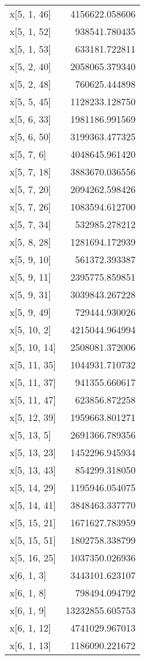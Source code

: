\begin{longtable}{lr}
x[5, 1, 46] & 4156622.058606 \\
x[5, 1, 52] & 938541.780435 \\
x[5, 1, 53] & 633181.722811 \\
x[5, 2, 40] & 2058065.379340 \\
x[5, 2, 48] & 760625.444898 \\
x[5, 5, 45] & 1128233.128750 \\
x[5, 6, 33] & 1981186.991569 \\
x[5, 6, 50] & 3199363.477325 \\
x[5, 7, 6] & 4048645.961420 \\
x[5, 7, 18] & 3883670.036556 \\
x[5, 7, 20] & 2094262.598426 \\
x[5, 7, 26] & 1083594.612700 \\
x[5, 7, 34] & 532985.278212 \\
x[5, 8, 28] & 1281694.172939 \\
x[5, 9, 10] & 561372.393387 \\
x[5, 9, 11] & 2395775.859851 \\
x[5, 9, 31] & 3039843.267228 \\
x[5, 9, 49] & 729444.930026 \\
x[5, 10, 2] & 4215044.964994 \\
x[5, 10, 14] & 2508081.372006 \\
x[5, 11, 35] & 1044931.710732 \\
x[5, 11, 37] & 941355.660617 \\
x[5, 11, 47] & 623856.872258 \\
x[5, 12, 39] & 1959663.801271 \\
x[5, 13, 5] & 2691366.789356 \\
x[5, 13, 23] & 1452296.945934 \\
x[5, 13, 43] & 854299.318050 \\
x[5, 14, 29] & 1195946.054075 \\
x[5, 14, 41] & 3848463.337770 \\
x[5, 15, 21] & 1671627.783959 \\
x[5, 15, 51] & 1802758.338799 \\
x[5, 16, 25] & 1037350.026936 \\
x[6, 1, 3] & 3443101.623107 \\
x[6, 1, 8] & 798494.094792 \\
x[6, 1, 9] & 13232855.605753 \\
x[6, 1, 12] & 4741029.967013 \\
x[6, 1, 13] & 1186090.221672 \\

\end{longtable}
